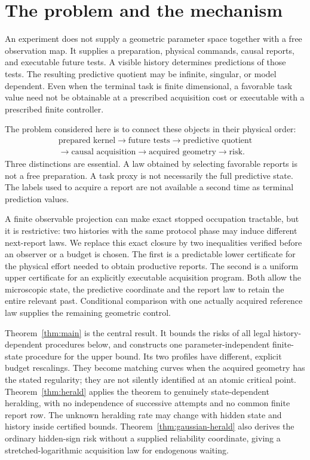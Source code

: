 \section{The problem and the mechanism}
An experiment does not supply a geometric parameter space together with a free observation map. It supplies a preparation, physical commands, causal reports, and executable future tests. A visible history determines predictions of those tests. The resulting predictive quotient may be infinite, singular, or model dependent. Even when the terminal task is finite dimensional, a favorable task value need not be obtainable at a prescribed acquisition cost or executable with a prescribed finite controller.

The problem considered here is to connect these objects in their physical order:
\[
 \begin{gathered}
 \text{prepared kernel}\longrightarrow\text{future tests}
 \longrightarrow\text{predictive quotient}\\
 \longrightarrow\text{causal acquisition}
 \longrightarrow\text{acquired geometry}\longrightarrow\text{risk}.
 \end{gathered}
\]
Three distinctions are essential. A law obtained by selecting favorable reports is not a free preparation. A task proxy is not necessarily the full predictive state. The labels used to acquire a report are not available a second time as terminal prediction values.

A finite observable projection can make exact stopped occupation tractable, but it is restrictive: two histories with the same protocol phase may induce different next-report laws. We replace this exact closure by two inequalities verified before an observer or a budget is chosen. The first is a predictable lower certificate for the physical effort needed to obtain productive reports. The second is a uniform upper certificate for an explicitly executable acquisition program. Both allow the microscopic state, the predictive coordinate and the report law to retain the entire relevant past. Conditional comparison with one actually acquired reference law supplies the remaining geometric control.

Theorem~\ref{thm:main} is the central result. It bounds the risks of all legal history-dependent procedures below, and constructs one parameter-independent finite-state procedure for the upper bound. Its two profiles have different, explicit budget rescalings. They become matching curves when the acquired geometry has the stated regularity; they are not silently identified at an atomic critical point. Theorem~\ref{thm:herald} applies the theorem to genuinely state-dependent heralding, with no independence of successive attempts and no common finite report row. The unknown heralding rate may change with hidden state and history inside certified bounds. Theorem~\ref{thm:gaussian-herald} also derives the ordinary hidden-sign risk without a supplied reliability coordinate, giving a stretched-logarithmic acquisition law for endogenous waiting.

